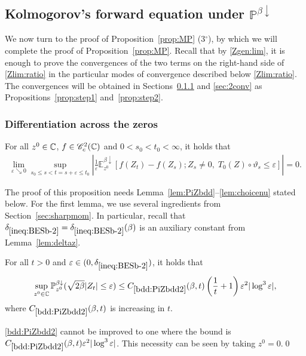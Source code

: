 \documentclass[12pt, twoside]{article}
\numberwithin{figure}{section}
\newcommand{\1}{\mathds 1}
\newcommand{\C}{{\mathscr C}}
\newcommand{\vep}{{\varepsilon}}
\newcommand{\da}{{\downarrow}}
\renewcommand{\P}{{\mathbb P}}
\newcommand{\E}{{\mathbb E}}
\newcommand{\2}{{\mathbf 1}}
\newcommand{\cc}{{^\circ}}
\newcommand{\deltaz}{\delta_{\ref{ineq:BESb-2}}}
\begin{document}
\subsection{Kolmogorov's forward equation under $\P^{\beta\da}$}\label{sec:forwardeqn}
We now turn to the proof of Proposition~\ref{prop:MP} (3$\cc$), by which we will complete the proof of Proposition~\ref{prop:MP}. Recall that by \eqref{Zgen:lim}, it is enough to prove the convergences of the two terms on the right-hand side of \eqref{Zlim:ratio} in the particular modes of convergence described below \eqref{Zlim:ratio}. The convergences will be obtained in Sections~\ref{sec:1conv} and \ref{sec:2conv} as Propositions~\ref{prop:step1} and~\ref{prop:step2}. 

\subsubsection{Differentiation across the zeros}\label{sec:1conv}

\begin{prop}\label{prop:step1}
For all $z^0\in \Bbb C$, $f\in \C^2_c(\Bbb C)$ and $0<s_0<t_0<\infty$, it holds that
\begin{align}\label{goal:step1}
\lim_{\vep\searrow 0}
\sup_{s_0\leq s<t=s+\vep\leq t_0}
\left|\frac{1}{\vep}\E^{\beta\da}_{z^0}[f(Z_{t})-f(Z_s);Z_s\neq 0,\;T_0(Z)\circ \vartheta_s\leq \vep]\right|=0.
\end{align}
\end{prop}

The proof of this proposition needs Lemma~\ref{lem:PiZbdd}--\ref{lem:choicenu} stated below. 
For the first lemma, we use several ingredients from Section~\ref{sec:sharpmom}. In particular, recall that $\deltaz=\deltaz(\beta)$ is an auxiliary constant from Lemma~\ref{lem:deltaz}. 

\begin{lem}\label{lem:PiZbdd}
For all $t>0$ and $\vep\in (0,\deltaz)$, it holds that
\begin{align}\label{bdd:PiZbdd2}
\sup_{z^0\in \Bbb C}\P^{\beta\da}_{z^0}(\sqrt{2\beta}|Z_t|\leq \vep)
\leq C_{\ref{bdd:PiZbdd2}}(\beta,t)\left(\frac{1}{t}+1\right)\vep^2|\log^3\vep|,
\end{align}
where $C_{\ref{bdd:PiZbdd2}}(\beta,t)$ is increasing in $t$. 
\end{lem}

\begin{rmk}
 \eqref{bdd:PiZbdd2} cannot be improved to one where the bound is $C_{\ref{bdd:PiZbdd2}}(\beta,t)\vep^2|\log^3\vep|$. This necessity can be seen by taking $z^0=0$.\qed
 \end{rmk}
\end{document}
